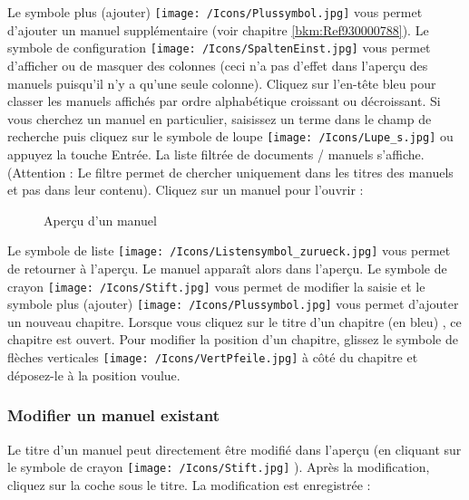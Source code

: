 Le symbole plus (ajouter) \texttt{[image: /Icons/Plussymbol.jpg]}  vous permet d'ajouter un manuel supplémentaire (voir chapitre \ref{bkm:Ref930000788}). Le symbole de configuration \texttt{[image: /Icons/SpaltenEinst.jpg]}  vous permet d'afficher ou de masquer des colonnes (ceci n'a pas d'effet dans l'aperçu des manuels puisqu'il n'y a qu'une seule colonne). Cliquez sur l'en-tête bleu  pour classer les manuels affichés par ordre alphabétique croissant ou décroissant. Si vous cherchez un manuel en particulier, saisissez un terme dans le champ de recherche  puis cliquez sur le symbole de loupe \texttt{[image: /Icons/Lupe\_s.jpg]} ou appuyez la touche Entrée. La liste filtrée de documents / manuels s'affiche. (Attention : Le filtre permet de chercher uniquement dans les titres des manuels et pas dans leur contenu). Cliquez sur un manuel  pour l'ouvrir :

\begin{figure}[H]
\caption{Aperçu d'un manuel}
\end{figure}

Le symbole de liste \texttt{[image: /Icons/Listensymbol\_zurueck.jpg]}  vous permet de retourner à l'aperçu. Le manuel apparaît alors dans l'aperçu. Le symbole de crayon \texttt{[image: /Icons/Stift.jpg]}  vous permet de modifier la saisie et le symbole plus (ajouter) \texttt{[image: /Icons/Plussymbol.jpg]}  vous permet d'ajouter un nouveau chapitre. Lorsque vous cliquez sur le titre d'un chapitre (en bleu) , ce chapitre est ouvert. Pour modifier la position d'un chapitre, glissez le symbole de flèches verticales \texttt{[image: /Icons/VertPfeile.jpg]}  à côté du chapitre et déposez-le à la position voulue.

\subsubsection{Modifier un manuel existant}

Le titre d'un manuel peut directement être modifié dans l'aperçu (en cliquant sur le symbole de crayon \texttt{[image: /Icons/Stift.jpg]} ). Après la modification, cliquez sur la coche sous le titre. La modification est enregistrée :

